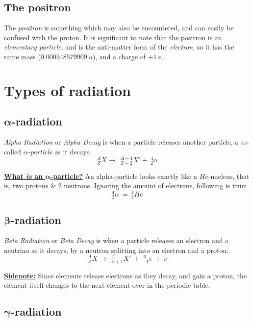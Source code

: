 \documentclass[12pt]{article}
\begin{document}
\subsection{The positron}

The \emph{positron} is something which may also be encountered, and can easily be confused with the proton. It is significant to note that the positron is an \emph{elementary particle}, and is the anti-matter form of the \emph{electron}, so it has the same mass ($0.000548579909 \ u$), and a charge of $+1 \ e$.

\section{Types of radiation}




\subsection{$\bm{\alpha}$-radiation}
\emph{Alpha Radiation} or \emph{Alpha Decay} is when a particle releases another particle, a so-called \emph{$\alpha$-particle} as it decays.
$$^{A}_{Z}X \rightarrow \ \ ^{A-4}_{Z-2}X' + \ ^{4}_{2}\alpha$$

\begin{boxA}
	\textbf{\underline{What \emph{is} an $\bm{\alpha}$-particle?}} \bigbreak
	An alpha-particle looks exactly like a $He$-nucleus, that is, two protons \& 2 neutrons. Ignoring the amount of electrons, following is true: $$^{4}_{2}\alpha \ = \ ^{4}_{2}He$$
\end{boxA}


\subsection{$\bm{\beta}$-radiation}
\emph{Beta Radiation} or \emph{Beta Decay} is when a particle releases an electron and a neutrino as it decays, by a neutron splitting into an electron and a proton. 
\bigbreak
$$^{A}_{Z}X \rightarrow \ \ ^{A}_{Z+1}X' \ + \ ^{\ 0}_{-1}e \ + \ \bar{v}$$
\begin{boxA}
	\textbf{\underline{Sidenote:}} \bigbreak
Since elements release electrons as they decay, and gain a proton, the element itself changes to the next element over in the periodic table.
\end{boxA}

\subsection{$\bm{\gamma}$-radiation}
\end{document}

